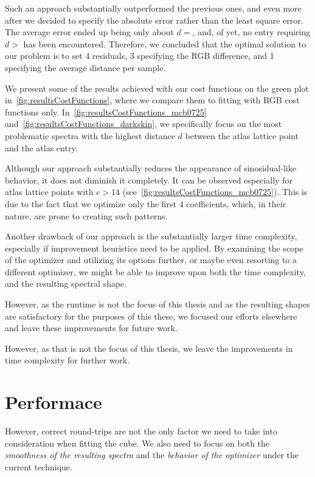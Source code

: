 Such an approach substantially outperformed the previous ones, and even more after we decided to specify the absolute error rather than the least square error. The average error ended up being only about $d = $, and, of yet, no entry requiring $d > $ has been encountered. Therefore, we concluded that the optimal solution to our problem is to set 4 residuals, 3 specifying the RGB difference, and 1 specifying the average distance per sample.

We present some of the results achieved with our cost functions on the green plot in~\cref{fig:resultsCostFunctions}, where we compare them to fitting with RGB cost functions only. In~\cref{fig:resultsCostFunctions_mcb0725} and~\cref{fig:resultsCostFunctions_darkskin}, we specifically focus on the most problematic spectra with the highest distance $d$ between the atlas lattice point and the atlas entry.

Although our approach substantially reduces the appearance of sinosidual-like behavior, it does not diminish it completely. It can be observed especially for atlas lattice points with $c > 14$ (see~\cref{fig:resultsCostFunctions_mcb0725}). This is due to the fact that we optimize only the first 4 coefficients, which, in their nature, are prone to creating such patterns.

Another drawback of our approach is the substantially larger time complexity, especially if improvement heuristics need to be applied. By examining the scope of the optimizer and utilizing its options further, or maybe even resorting to a different optimizer, we might be able to improve upon both the time complexity, and the resulting spectral shape.

However, as the runtime is not the focus of this thesis and as the resulting shapes are satisfactory for the purposes of this these, we focused our efforts elsewhere and leave these improvements for future work.

 However, as that is not the focus of this thesis, we leave the improvements in time complexity for further work.

\section{Performace}

However, correct round-trips are not the only factor we need to take into consideration when fitting the cube. We also need to focus on both the \emph{smoothness of the resulting spectra} and the \emph{behavior of the optimizer} under the current technique.


